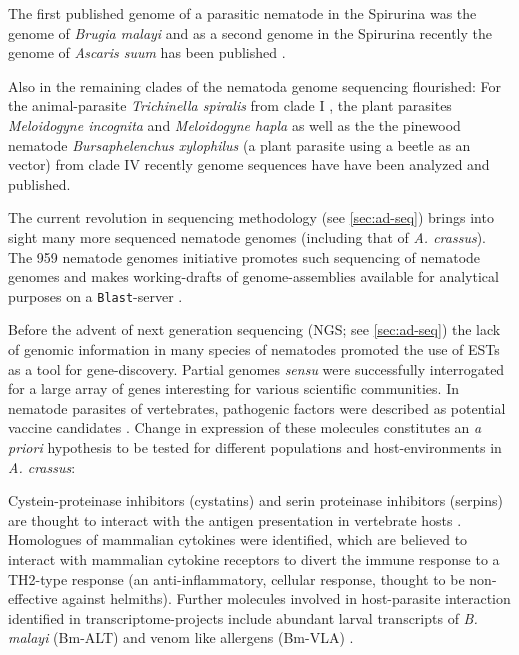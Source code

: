 The first published genome of a parasitic nematode in the Spirurina
was the genome of \textit{Brugia malayi} \cite{ghedin_draft_2007} and
as a second genome in the Spirurina recently the genome of
\textit{Ascaris suum} has been published \cite{pmid22031327}.

Also in the remaining clades of the nematoda genome sequencing
flourished: For the animal-parasite \textit{Trichinella spiralis} from
clade I \cite{pmid21336279}, the plant parasites \textit{Meloidogyne
  incognita} \cite{pmid18660804} and \textit{Meloidogyne hapla}
\cite{pmid18809916} as well as the the pinewood nematode
\textit{Bursaphelenchus xylophilus} \cite{pmid21909270} (a plant
parasite using a beetle as an vector) from clade IV recently genome
sequences have have been analyzed and published.

The current revolution in sequencing methodology (see
\ref{sec:ad-seq}) brings into sight many more sequenced nematode
genomes (including that of \textit{A. crassus}). The 959 nematode
genomes initiative promotes such sequencing of nematode genomes and
makes working-drafts of genome-assemblies available for analytical
purposes on a \texttt{Blast}-server \cite{pmid22058131}.

Before the advent of next generation sequencing (NGS; see
\ref{sec:ad-seq}) the lack of genomic information in many species of
nematodes promoted the use of ESTs as a tool for
gene-discovery. Partial genomes \textit{sensu}
\cite{parkinson_partigene--constructing_2004} were successfully
interrogated for a large array of genes interesting for various
scientific communities. In nematode parasites of vertebrates,
pathogenic factors were described as potential vaccine candidates
\cite{pmid11406138}. Change in expression of these molecules
constitutes an \textit{a priori} hypothesis to be tested for different
populations and host-environments in \textit{A. crassus}:

Cystein-proteinase inhibitors (cystatins) and serin proteinase
inhibitors (serpins) are thought to interact with the antigen
presentation in vertebrate hosts \cite{pmid11406138}. Homologues of
mammalian cytokines were identified, which are believed to interact
with mammalian cytokine receptors to divert the immune response to a
TH2-type response \cite{maizels_helminth_2004} (an anti-inflammatory,
cellular response, thought to be non-effective against
helmiths). Further molecules involved in host-parasite interaction
identified in transcriptome-projects include abundant larval
transcripts of \textit{B. malayi} (Bm-ALT)
\cite{gomez-escobar_abundant_2002} and venom like allergens (Bm-VLA)
\cite{pmid11704277}.

